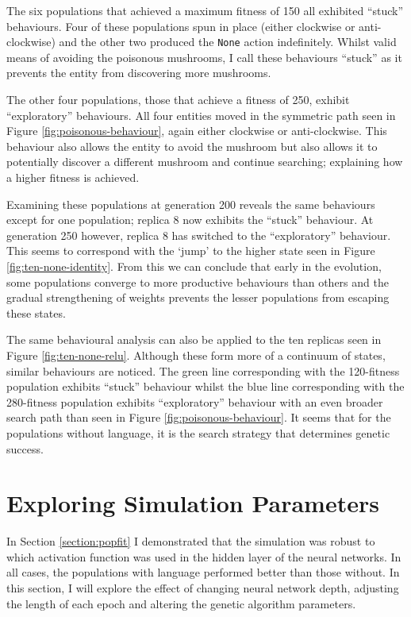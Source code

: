 \documentclass[12pt,a4paper,twoside,openright]{report}
\begin{document}
The six populations that achieved a maximum fitness of 150 all exhibited ``stuck'' behaviours. Four of these populations spun in place (either clockwise or anti-clockwise) and the other two produced the \verb~None~ action indefinitely. Whilst valid means of avoiding the poisonous mushrooms, I call these behaviours ``stuck'' as it prevents the entity from discovering more mushrooms.

The other four populations, those that achieve a fitness of 250, exhibit ``exploratory'' behaviours. All four entities moved in the symmetric path seen in Figure \ref{fig:poisonous-behaviour}, again either clockwise or anti-clockwise. This behaviour also allows the entity to avoid the mushroom but also allows it to potentially discover a different mushroom and continue searching; explaining how a higher fitness is achieved. 

Examining these populations at generation 200 reveals the same behaviours except for one population; replica 8 now exhibits the ``stuck'' behaviour. At generation 250 however, replica 8 has switched to the ``exploratory'' behaviour. This seems to correspond with the `jump' to the higher state seen in Figure \ref{fig:ten-none-identity}. From this we can conclude that early in the evolution, some populations converge to more productive behaviours than others and the gradual strengthening of weights prevents the lesser populations from escaping these states.

The same behavioural analysis can also be applied to the ten replicas seen in Figure \ref{fig:ten-none-relu}. Although these form more of a continuum of states, similar behaviours are noticed. The green line corresponding with the 120-fitness population exhibits ``stuck'' behaviour whilst the blue line corresponding with the 280-fitness population exhibits ``exploratory'' behaviour with an even broader search path than seen in Figure \ref{fig:poisonous-behaviour}. It seems that for the populations without language, it is the search strategy that determines genetic success.

\section{Exploring Simulation Parameters}\label{section:simulation-parameters}

In Section \ref{section:popfit} I demonstrated that the simulation was robust to which activation function was used in the hidden layer of the neural networks. In all cases, the populations with language performed better than those without. In this section, I will explore the effect of changing neural network depth, adjusting the length of each epoch and altering the genetic algorithm parameters.
\end{document}
